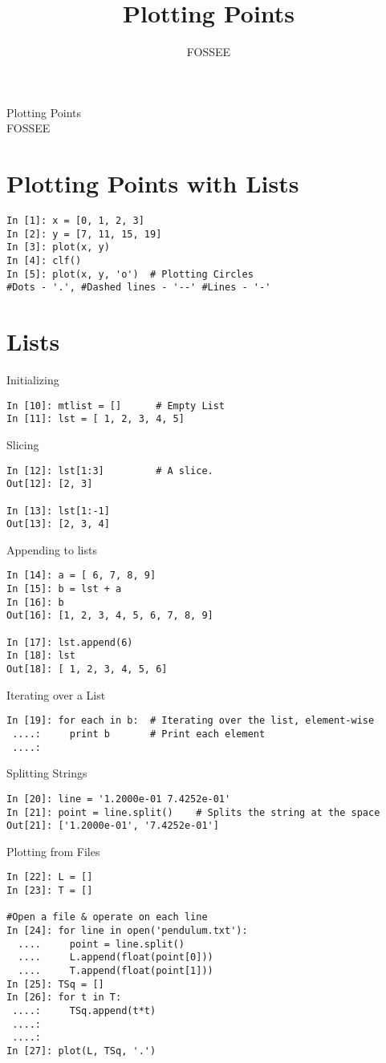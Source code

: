 \documentclass[12pt]{article}
\title{Plotting Points}
\author{FOSSEE}
\begin{document}
\date{}
\vspace{-1in}
\begin{center}
\LARGE{Plotting Points}\\
\large{FOSSEE}
\end{center}
\section{Plotting Points with Lists}

\begin{lstlisting}
In [1]: x = [0, 1, 2, 3]
In [2]: y = [7, 11, 15, 19]
In [3]: plot(x, y)
In [4]: clf()
In [5]: plot(x, y, 'o')  # Plotting Circles
#Dots - '.', #Dashed lines - '--' #Lines - '-'
\end{lstlisting}

\section{Lists}

Initializing
  \begin{lstlisting}
In [10]: mtlist = []      # Empty List
In [11]: lst = [ 1, 2, 3, 4, 5] 
  \end{lstlisting}
Slicing
\begin{lstlisting}
In [12]: lst[1:3]         # A slice.
Out[12]: [2, 3]

In [13]: lst[1:-1]
Out[13]: [2, 3, 4]
\end{lstlisting}
Appending to lists
\begin{lstlisting}
In [14]: a = [ 6, 7, 8, 9]
In [15]: b = lst + a
In [16]: b
Out[16]: [1, 2, 3, 4, 5, 6, 7, 8, 9]

In [17]: lst.append(6)
In [18]: lst
Out[18]: [ 1, 2, 3, 4, 5, 6]
\end{lstlisting}

Iterating over a List
\begin{lstlisting}
In [19]: for each in b:  # Iterating over the list, element-wise
 ....:     print b       # Print each element
 ....:
\end{lstlisting}

Splitting Strings
\begin{lstlisting}
In [20]: line = '1.2000e-01 7.4252e-01'
In [21]: point = line.split()    # Splits the string at the space
Out[21]: ['1.2000e-01', '7.4252e-01']
\end{lstlisting}

Plotting from Files
\begin{lstlisting}
In [22]: L = []
In [23]: T = []

#Open a file & operate on each line
In [24]: for line in open('pendulum.txt'):  
  ....     point = line.split()
  ....     L.append(float(point[0]))
  ....     T.append(float(point[1]))
In [25]: TSq = []
In [26]: for t in T:
 ....:     TSq.append(t*t)
 ....:     
 ....:     
In [27]: plot(L, TSq, '.')
\end{lstlisting}
\end{document}
